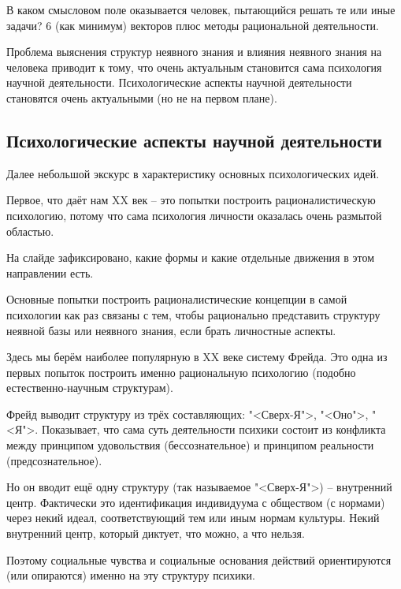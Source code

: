 \documentclass[main.tex]{subfiles}
\begin{document}

В каком смысловом поле оказывается человек, пытающийся решать те или иные задачи?
6 (как минимум) векторов плюс методы рациональной деятельности.

Проблема выяснения структур неявного знания и влияния неявного знания на человека приводит к тому, что очень актуальным становится сама психология научной деятельности.
Психологические аспекты научной деятельности становятся очень актуальными (но не на первом плане).

\subsection{Психологические аспекты научной деятельности}


Далее небольшой экскурс в характеристику основных психологических идей.

Первое, что даёт нам XX век -- это попытки построить рационалистическую психологию, потому что сама психология личности оказалась очень размытой областью.

На слайде зафиксировано, какие формы и какие отдельные движения в этом направлении есть.


Основные попытки построить рационалистические концепции в самой психологии как раз связаны с тем, чтобы рационально представить структуру неявной базы или неявного знания, если брать личностные аспекты.

Здесь мы берём наиболее популярную в XX веке систему Фрейда.
Это одна из первых попыток построить именно рациональную психологию (подобно естественно-научным структурам).

Фрейд выводит структуру из трёх составляющих: "<Сверх-Я">, "<Оно">, "<Я">.
Показывает, что сама суть деятельности психики состоит из конфликта между принципом удовольствия (бессознательное) и принципом реальности (предсознательное).

Но он вводит ещё одну структуру (так называемое "<Сверх-Я">) -- внутренний центр.
Фактически это идентификация индивидуума с обществом (с нормами) через некий идеал, соответствующий тем или иным нормам культуры.
Некий внутренний центр, который диктует, что можно, а что нельзя.

Поэтому социальные чувства и социальные основания действий ориентируются (или опираются) именно на эту структуру психики.
\end{document}
